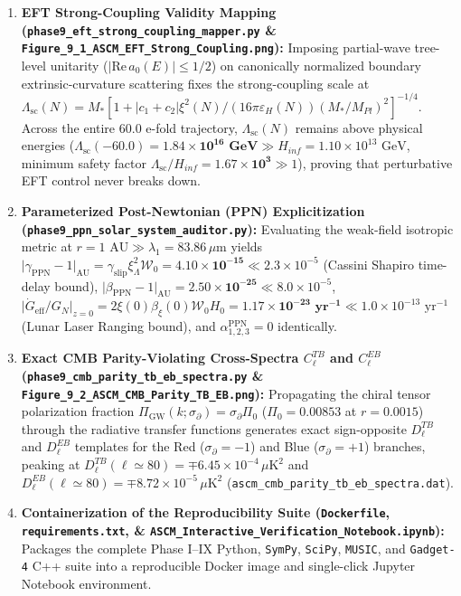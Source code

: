 \documentclass[aps,prd,onecolumn,superscriptaddress,nofootinbib,longbibliography,10pt]{revtex4-2}
\begin{document}
\begin{enumerate}
  
\item \textbf{EFT Strong-Coupling Validity Mapping (\texttt{phase9_eft_strong_coupling_mapper.py} \& \texttt{Figure_9_1_ASCM_EFT_Strong_Coupling.png}):} Imposing partial-wave tree-level unitarity (\(|\mathrm{Re}\,a_0(E)| \le 1/2\)) on canonically normalized boundary extrinsic-curvature scattering fixes the strong-coupling scale at \(\Lambda_{\mathrm{sc}}(N) = M_*[1 + |c_1+c_2|\xi^2(N)/(16\pi\varepsilon_H(N))(M_*/M_{Pl})^2]^{-1/4}\). Across the entire \(60.0\) e-fold trajectory, \(\Lambda_{\mathrm{sc}}(N)\) remains above physical energies (\(\Lambda_{\mathrm{sc}}(-60.0) = \mathbf{1.84 \times 10^{16}\text{ GeV}} \gg H_{inf} = 1.10 \times 10^{13}\text{ GeV}\), minimum safety factor \(\Lambda_{\mathrm{sc}}/H_{inf} = \mathbf{1.67 \times 10^3} \gg 1\)), proving that perturbative EFT control never breaks down.
  
\item \textbf{Parameterized Post-Newtonian (PPN) Explicitization (\texttt{phase9_ppn_solar_system_auditor.py}):} Evaluating the weak-field isotropic metric at \(r = 1\text{ AU} \gg \lambda_1 = 83.86\,\mu\text{m}\) yields \(\big|\gamma_{\mathrm{PPN}} - 1\big|_{\mathrm{AU}} = \gamma_{\mathrm{slip}}\xi_\Lambda^2\mathcal{W}_0 = \mathbf{4.10 \times 10^{-15}} \ll 2.3 \times 10^{-5}\) (Cassini Shapiro time-delay bound), \(\big|\beta_{\mathrm{PPN}} - 1\big|_{\mathrm{AU}} = \mathbf{2.50 \times 10^{-25}} \ll 8.0 \times 10^{-5}\), \(\big|\dot{G}_{\mathrm{eff}}/G_N\big|_{z=0} = 2\xi(0)\beta_\xi(0)\mathcal{W}_0 H_0 = \mathbf{1.17 \times 10^{-23}\text{ yr}^{-1}} \ll 1.0 \times 10^{-13}\text{ yr}^{-1}\) (Lunar Laser Ranging bound), and \(\alpha_{1,2,3}^{\mathrm{PPN}} = 0\) identically.
  
\item \textbf{Exact CMB Parity-Violating Cross-Spectra \(C_\ell^{TB}\) and \(C_\ell^{EB}\) (\texttt{phase9_cmb_parity_tb_eb_spectra.py} \& \texttt{Figure_9_2_ASCM_CMB_Parity_TB_EB.png}):} Propagating the chiral tensor polarization fraction \(\Pi_{\mathrm{GW}}(k;\sigma_{\partial}) = \sigma_{\partial}\Pi_0\) (\(\Pi_0 = 0.00853\) at \(r = 0.0015\)) through the radiative transfer functions generates exact sign-opposite \(D_\ell^{TB}\) and \(D_\ell^{EB}\) templates for the Red (\(\sigma_{\partial} = -1\)) and Blue (\(\sigma_{\partial} = +1\)) branches, peaking at \(D_\ell^{TB}(\ell \simeq 80) = \mp 6.45 \times 10^{-4}\,\mu\mathrm{K}^2\) and \(D_\ell^{EB}(\ell \simeq 80) = \mp 8.72 \times 10^{-5}\,\mu\mathrm{K}^2\) (\texttt{ascm_cmb_parity_tb_eb_spectra.dat}).
  
\item \textbf{Containerization of the Reproducibility Suite (\texttt{Dockerfile}, \texttt{requirements.txt}, \& \texttt{ASCM_Interactive_Verification_Notebook.ipynb}):} Packages the complete Phase I–IX Python, \texttt{SymPy}, \texttt{SciPy}, \texttt{MUSIC}, and \texttt{Gadget-4} C++ suite into a reproducible Docker image and single-click Jupyter Notebook environment.

\end{enumerate}
\end{document}
